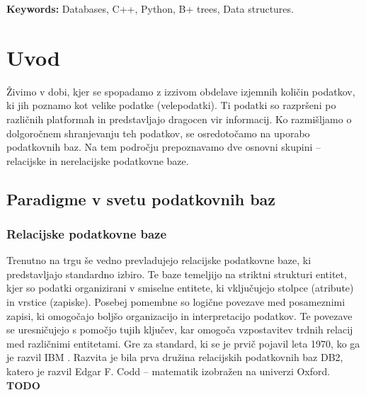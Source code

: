 \documentclass[a4paper,12pt,openright]{book}
\newcommand{\tkeywordsEn}{Databases, C++, Python, B+ trees, Data structures}
\newcommand{\clearemptydoublepage}{\newpage{\pagestyle{empty}\cleardoublepage}}
\begin{document}
\noindent\textbf{Keywords:} \tkeywordsEn.
\clearemptydoublepage

\mainmatter
\setcounter{page}{1}
\pagestyle{fancy}


\chapter{Uvod}
    Živimo v dobi, kjer se spopadamo z izzivom obdelave izjemnih količin podatkov, ki jih poznamo kot velike podatke (velepodatki). Ti podatki so razpršeni po različnih platformah in predstavljajo dragocen vir informacij. Ko razmišljamo o dolgoročnem shranjevanju teh podatkov, se osredotočamo na uporabo podatkovnih baz. Na tem področju prepoznavamo dve osnovni skupini – relacijske in nerelacijske podatkovne baze.
    \section{Paradigme v svetu podatkovnih baz}
        \subsection{Relacijske podatkovne baze}
        Trenutno na trgu še vedno prevladujejo relacijske podatkovne baze, ki predstavljajo standardno izbiro. Te baze temeljijo na striktni strukturi entitet, kjer so podatki organizirani v smiselne entitete, ki vključujejo stolpce (atribute) in vrstice (zapiske). Posebej pomembne so logične povezave med posameznimi zapisi, ki omogočajo boljšo organizacijo in interpretacijo podatkov. Te povezave se uresničujejo s pomočjo tujih ključev, kar omogoča vzpostavitev trdnih relacij med različnimi entitetami.
        \newline
        \newline
        \noindent
        Gre za standard, ki se je prvič pojavil leta 1970, ko ga je razvil IBM \cite{IBM_DMBS_1970}. Razvita je bila prva družina relacijskih podatkovnih baz DB2, katero je razvil Edgar F. Codd – matematik izobražen na univerzi Oxford.
        \textbf{TODO}
        
\end{document}
